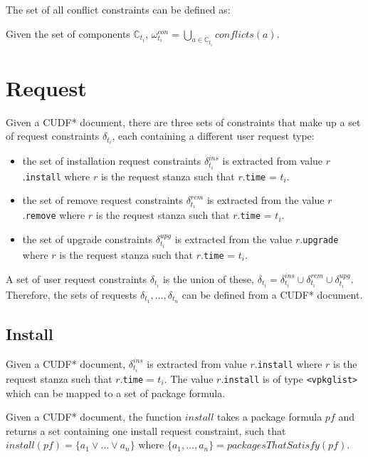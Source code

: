 The set of all conflict constraints can be defined as:
\begin{defs}
Given the set of components $\mathbb{C}_{t_i}$,
$\omega_{t_i}^{con} = \bigcup \limits_{a\in \mathbb{C}_{t_i}} conflicts(a)$.
\end{defs} 

\section{Request}
\label{formal.cudf.request}
Given a CUDF* document, there are three sets of constraints that make up a set of request constraints $\delta_{t_i}$, each containing a different user request type:
\begin{itemize}
  \item the set of installation request constraints $\delta_{t_i}^{ins}$ is extracted from value $r$.\texttt{install} where $r$ is the request stanza such that $r$.\texttt{time} = $t_i$.
  \item the set of remove request constraints  $\delta_{t_i}^{rem}$ is extracted from the value $r$.\texttt{remove} where $r$ is the request stanza such that $r$.\texttt{time} = $t_i$.
  \item the set of upgrade constraints $\delta_{t_i}^{upg}$ is extracted from the value $r$.\texttt{upgrade} where $r$ is the request stanza such that $r$.\texttt{time} = $t_i$.
\end{itemize}
A set of user request constraints $\delta_{t_i}$ is the union of these,
$\delta_{t_i} =  \delta_{t_i}^{ins} \cup \delta_{t_i}^{rem} \cup \delta_{t_i}^{upg}$.
Therefore, the sets of requests $\delta_{t_1},\ldots,\delta_{t_n}$ can be defined from a CUDF* document.

\subsection{Install}
Given a CUDF* document, $\delta_{t_i}^{ins}$ is extracted from value $r$.\texttt{install} where $r$ is the request stanza such that $r$.\texttt{time} = $t_i$.
The value $r$.\texttt{install} is of type \texttt{<vpkglist>} which can be mapped to a set of package formula.
\begin{defs}
Given a CUDF* document, 
the function $install$ takes a package formula $pf$ and returns a set containing one install request constraint, 
such that $install(pf) = \{a_1 \vee \ldots \vee a_n\}$ where $\{a_1,\ldots,a_n\} = packagesThatSatisfy(pf)$.
\end{defs}

